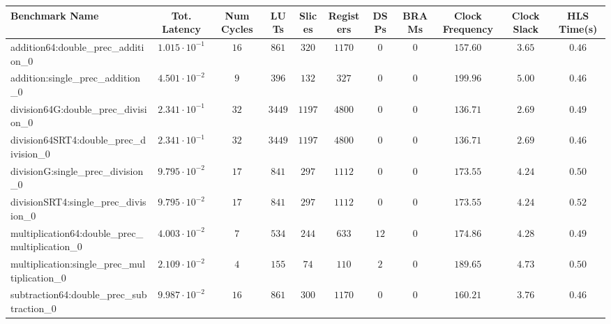 \begin{tabular}{|l|c|c|c|c|c|c|c|c|c|c|}
\hline
Benchmark Name                                   & Tot. Latency            & Num Cycles & LUTs      & Slices   & Registers & DSPs   & BRAMs & Clock Frequency & Clock Slack & HLS Time(s) \\
\hline
addition64:double\_prec\_addition\_0             & $ 1.015 \cdot 10^{-1} $ & $ 16     $ & $ 861   $ & $ 320  $ & $ 1170  $ & $ 0  $ & $ 0 $ & $ 157.60      $ & $ 3.65    $ & $ 0.46    $ \\
addition:single\_prec\_addition\_0               & $ 4.501 \cdot 10^{-2} $ & $ 9      $ & $ 396   $ & $ 132  $ & $ 327   $ & $ 0  $ & $ 0 $ & $ 199.96      $ & $ 5.00    $ & $ 0.46    $ \\
division64G:double\_prec\_division\_0            & $ 2.341 \cdot 10^{-1} $ & $ 32     $ & $ 3449  $ & $ 1197 $ & $ 4800  $ & $ 0  $ & $ 0 $ & $ 136.71      $ & $ 2.69    $ & $ 0.49    $ \\
division64SRT4:double\_prec\_division\_0         & $ 2.341 \cdot 10^{-1} $ & $ 32     $ & $ 3449  $ & $ 1197 $ & $ 4800  $ & $ 0  $ & $ 0 $ & $ 136.71      $ & $ 2.69    $ & $ 0.46    $ \\
divisionG:single\_prec\_division\_0              & $ 9.795 \cdot 10^{-2} $ & $ 17     $ & $ 841   $ & $ 297  $ & $ 1112  $ & $ 0  $ & $ 0 $ & $ 173.55      $ & $ 4.24    $ & $ 0.50    $ \\
divisionSRT4:single\_prec\_division\_0           & $ 9.795 \cdot 10^{-2} $ & $ 17     $ & $ 841   $ & $ 297  $ & $ 1112  $ & $ 0  $ & $ 0 $ & $ 173.55      $ & $ 4.24    $ & $ 0.52    $ \\
multiplication64:double\_prec\_multiplication\_0 & $ 4.003 \cdot 10^{-2} $ & $ 7      $ & $ 534   $ & $ 244  $ & $ 633   $ & $ 12 $ & $ 0 $ & $ 174.86      $ & $ 4.28    $ & $ 0.49    $ \\
multiplication:single\_prec\_multiplication\_0   & $ 2.109 \cdot 10^{-2} $ & $ 4      $ & $ 155   $ & $ 74   $ & $ 110   $ & $ 2  $ & $ 0 $ & $ 189.65      $ & $ 4.73    $ & $ 0.50    $ \\
subtraction64:double\_prec\_subtraction\_0       & $ 9.987 \cdot 10^{-2} $ & $ 16     $ & $ 861   $ & $ 300  $ & $ 1170  $ & $ 0  $ & $ 0 $ & $ 160.21      $ & $ 3.76    $ & $ 0.46    $ \\

\end{tabular}
